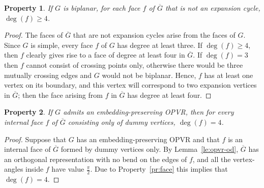 \documentclass{article}
\newtheorem{property}{Property}
\newcommand{\ph}{\frac{\pi}{2}}
\newcommand{\opvr}{OPVR\xspace}
\newcommand{\bG}{\overline{G}}
\begin{document}
\begin{property}\label{pr:bg-1}
If $G$ is biplanar, for each face $f$ of $\bG$ that is not an expansion cycle, $\deg(f) \geq 4$.
\end{property}
\begin{proof}
The faces of $\bG$ that are not expansion cycles arise from the faces of $G$.
Since $G$ is simple, every face $f$ of $G$ has degree at least three. If $\deg(f) \geq 4$, then $f$ clearly gives rise to a face of degree at least four in $\bG$. If $\deg(f)=3$ then $f$ cannot consist of crossing points only, otherwise there would be three mutually crossing edges and $G$ would not be biplanar. Hence, $f$ has at least one vertex on its boundary, and this vertex will correspond to two expansion vertices in $\bG$; then the face arising from $f$ in $\bG$ has degree at least four.
\end{proof}

\begin{property}\label{pr:bg-2}
If $G$ admits an embedding-preserving \opvr, then for every internal face $f$ of $\bG$ consisting only of dummy vertices, $\deg(f)=4$.
\end{property}
\begin{proof}
Suppose that $G$ has an embedding-preserving \opvr and that $f$ is an internal face of $\bG$ formed by dummy vertices only. By Lemma~\ref{le:opvr-od}, $\bG$ has an orthogonal representation with no bend on the edges of $f$, and all the vertex-angles inside $f$ have value $\ph$. Due to Property~\ref{pr:face} this implies that $\deg(f)=4$.
\end{proof}
\end{document}
